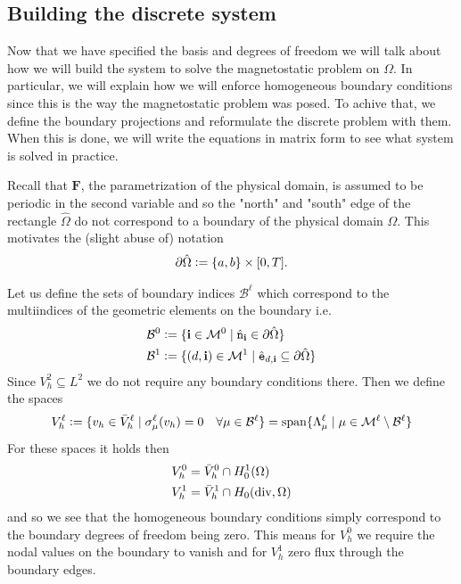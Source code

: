 \documentclass[../master_thesis.tex]{subfiles}
\begin{document}
\subsection{Building the discrete system}\label{sec:assembling_the_discrete_system}

Now that we have specified the basis and degrees of freedom we will talk about 
how we will build the system to solve the magnetostatic problem on $\Omega$. 
In particular, we will explain how we will enforce homogeneous boundary conditions since 
this is the way the magnetostatic problem was posed. To achive that, we 
define the boundary projections and reformulate the discrete problem with them.
When this is done, we will write the equations in matrix form to see 
what system is solved in practice. 

Recall that $\mathbf{F}$, the parametrization of the physical domain, is assumed to 
be periodic in the second variable and so the "north" and "south" edge of the 
rectangle $\hat{\Omega}$ do not correspond to a boundary of the physical domain 
$\Omega$. This motivates the 
(slight abuse of) notation 
\begin{align*}
    \partial \hat{\Omega} \vcentcolon= \{a,b\} \times [0,T].
\end{align*}

Let us define the sets of boundary indices $\mathcal{B}^\ell$ which correspond 
to the multiindices of the geometric elements on the boundary i.e. 
\begin{align*}
    \mathcal{B}^0 &\vcentcolon= \{ \mathbf{i} \in \mathcal{M}^0 
        \mid \hat{\mathtt{n}}_\mathbf{i} \in \partial \hat{\Omega} \}
    \\ \mathcal{B}^1 &\vcentcolon= \{ (d,\mathbf{i}) \in \mathcal{M}^1 
        \mid \hat{\mathtt{e}}_{d,\mathbf{i}} \subseteq \partial \hat{\Omega} \}
\end{align*}
Since $V_h^2 \subseteq L^2$ we do not require any boundary conditions there.
Then we define the spaces 
\begin{align*}
    V_h^\ell \vcentcolon= \{ v_h \in \bar{V}_h^\ell \mid \sigma^\ell_\mu (v_h) = 0 
        \quad \forall \mu \in \mathcal{B}^\ell \}
    = \operatorname{span} \{ \Lambda^\ell_\mu \mid \mu \in \mathcal{M}^\ell \setminus \mathcal{B}^\ell \}
\end{align*}
For these spaces it holds then
\begin{align*}
    V_h^0 &= \bar{V}_h^0 \cap H^1_0(\Omega)
    \\ V_h^1 &= \bar{V}_h^1 \cap H_0(\operatorname{div},\Omega)
\end{align*}
and so we see that the homogeneous boundary conditions simply correspond to the 
boundary degrees of freedom being zero. This means for $V_h^0$ we require the 
nodal values on the boundary to vanish and for $V_h^1$ zero flux through the boundary edges.
\end{document}
